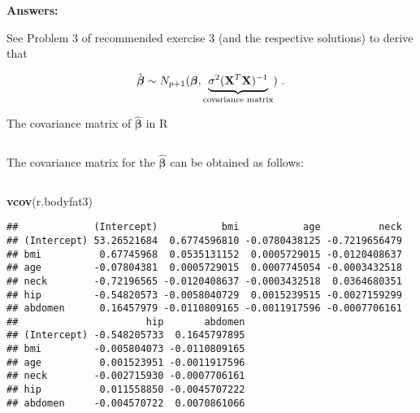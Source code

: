 \documentclass[10pt,ignorenonframetext,]{beamer}
\newenvironment{Shaded}{\begin{snugshade}}{\end{snugshade}}
\newcommand{\KeywordTok}[1]{\textcolor[rgb]{0.13,0.29,0.53}{\textbf{#1}}}
\newcommand{\NormalTok}[1]{#1}
\begin{document}
\begin{frame}

\textbf{Answers:}

See Problem 3 of recommended exercise 3 (and the respective solutions)
to derive that

\[\hat{\boldsymbol\beta}\sim N_{p+1}(\boldsymbol{\beta},\underbrace{\sigma^2({\bf X}^T{\bf X})^{-1}}_{\text{covariance matrix}}) \ . \]

\end{frame}

\begin{frame}[fragile]

\begin{block}{The covariance matrix of \(\boldsymbol{\hat\beta}\) in R}

\(~\)

The covariance matrix for the \(\boldsymbol{\hat\beta}\) can be obtained
as follows:

\(~\)

\scriptsize

\begin{Shaded}
\begin{Highlighting}[]
\KeywordTok{vcov}\NormalTok{(r.bodyfat3)}
\end{Highlighting}
\end{Shaded}

\begin{verbatim}
##             (Intercept)           bmi           age          neck
## (Intercept) 53.26521684  0.6774596810 -0.0780438125 -0.7219656479
## bmi          0.67745968  0.0535131152  0.0005729015 -0.0120408637
## age         -0.07804381  0.0005729015  0.0007745054 -0.0003432518
## neck        -0.72196565 -0.0120408637 -0.0003432518  0.0364680351
## hip         -0.54820573 -0.0058040729  0.0015239515 -0.0027159299
## abdomen      0.16457979 -0.0110809165 -0.0011917596 -0.0007706161
##                      hip       abdomen
## (Intercept) -0.548205733  0.1645797895
## bmi         -0.005804073 -0.0110809165
## age          0.001523951 -0.0011917596
## neck        -0.002715930 -0.0007706161
## hip          0.011558850 -0.0045707222
## abdomen     -0.004570722  0.0070861066
\end{verbatim}

\end{block}

\end{frame}
\end{document}

